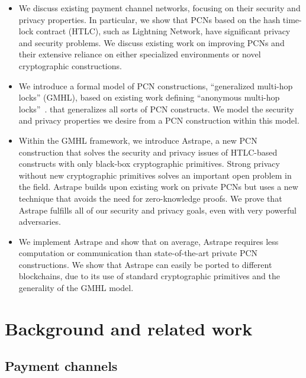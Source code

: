 \documentclass[USenglish,oneside,twocolumn]{article}
\begin{document}
\begin{itemize}
    \item We discuss existing payment channel networks, focusing on their security and privacy properties. In particular, we show that PCNs based on the hash time-lock contract (HTLC), such as Lightning Network, have significant privacy and security problems. We discuss existing work on improving PCNs and their extensive reliance on either specialized environments or novel cryptographic constructions.
    \item We introduce a formal model of PCN constructions, ``generalized multi-hop locks'' (GMHL), based on existing work defining ``anonymous multi-hop locks''~\cite{malavolta2019anonymous}. that generalizes all sorts of PCN constructs. We model the security and privacy properties we desire from a PCN construction within this model.
    \item Within the GMHL framework, we introduce Astrape, a new PCN construction that solves the security and privacy issues of HTLC-based constructs with only black-box cryptographic primitives. Strong privacy without new cryptographic primitives solves an important open problem in the field. Astrape builds upon existing work \cite{malavolta2017concurrency} on private PCNs but uses a new technique that avoids the need for zero-knowledge proofs. We prove that Astrape fulfills all of our security and privacy goals, even with very powerful adversaries.
    \item We implement Astrape and show that on average, Astrape requires less computation or communication than state-of-the-art private PCN constructions. We show that Astrape can easily be ported to different blockchains, due to its use of standard cryptographic primitives and the generality of the GMHL model.
\end{itemize}


\section{Background and related work} \label{sec:bg}

\subsection{Payment channels}
\end{document}
